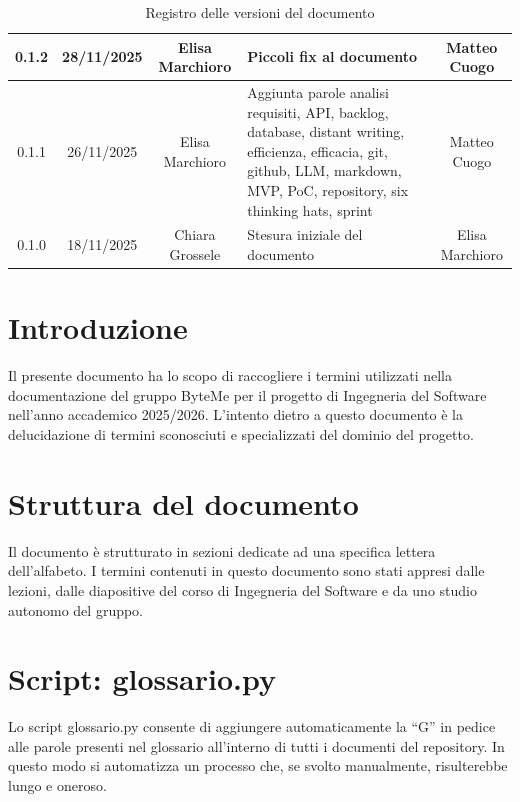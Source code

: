\documentclass[11pt,a4paper]{article}
\begin{document}
\begin{table}[H]
\begin{tabular}{|c|c|c|>{\raggedright\arraybackslash}p{}|c|}
        \hline
        0.1.2 & 28/11/2025 & Elisa Marchioro & Piccoli fix al documento & Matteo Cuogo\\
        \hline
        0.1.1 & 26/11/2025 & Elisa Marchioro & Aggiunta parole analisi requisiti, API, backlog, database, distant writing, efficienza, efficacia, git, github, LLM, markdown, MVP, PoC, repository, six thinking hats, sprint & Matteo Cuogo\\
        \hline
        0.1.0 & 18/11/2025 & Chiara Grossele & Stesura iniziale del documento & Elisa Marchioro\\
        \hline
    \end{tabular}
    \caption{Registro delle versioni del documento}
    \label{tab:versionamento}
\end{table}

\newpage

\tableofcontents
\thispagestyle{empty}
\newpage
\setcounter{page}{1}

\section{Introduzione}
Il presente documento ha lo scopo di raccogliere i termini utilizzati nella documentazione del gruppo ByteMe per il progetto di Ingegneria del Software nell'anno accademico 2025/2026.
L'intento dietro a questo documento è la delucidazione di termini sconosciuti e specializzati del dominio del progetto.

\section{Struttura del documento}
Il documento è strutturato in sezioni dedicate ad una specifica lettera dell'alfabeto. I termini contenuti in questo documento sono stati appresi dalle lezioni, dalle diapositive del corso di Ingegneria del Software e da uno studio autonomo del gruppo.

\section{Script: glossario.py}
Lo script glossario.py consente di aggiungere automaticamente la “G” in pedice alle parole presenti nel glossario all’interno di tutti i documenti del repository. In questo modo si automatizza un processo che, se svolto manualmente, risulterebbe lungo e oneroso.
\newpage
\end{document}
